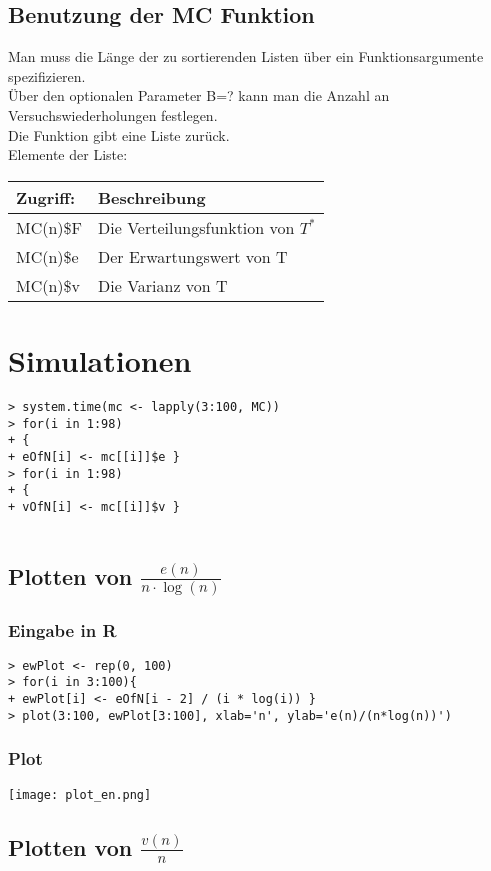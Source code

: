 \documentclass[a4paper, 10pt]{article}
\begin{document}
\subsection{Benutzung der MC Funktion}
Man muss die Länge der zu sortierenden Listen über ein Funktionsargumente spezifizieren.\\
Über den optionalen Parameter B=? kann man die Anzahl an Versuchswiederholungen festlegen.\\
Die Funktion gibt eine Liste zurück.\\
Elemente der Liste:\\
\begin{tabular}{l|l}
Zugriff: & Beschreibung \\ \hline
MC(n)\$F &	Die Verteilungsfunktion von $T^* $ \\
MC(n)\$e & Der Erwartungswert von T \\
MC(n)\$v & Die Varianz von T 

\end{tabular}
\section{Simulationen}
\begin{lstlisting}
> system.time(mc <- lapply(3:100, MC))
> for(i in 1:98)
+ {
+ eOfN[i] <- mc[[i]]$e }
> for(i in 1:98)
+ {
+ vOfN[i] <- mc[[i]]$v }


\end{lstlisting}
\subsection{Plotten von $ \frac{e(n)}{n\cdot \log(n)}$}
\subsubsection{Eingabe in R}
\begin{lstlisting}
> ewPlot <- rep(0, 100)
> for(i in 3:100){
+ ewPlot[i] <- eOfN[i - 2] / (i * log(i)) }
> plot(3:100, ewPlot[3:100], xlab='n', ylab='e(n)/(n*log(n))')
\end{lstlisting}
\subsubsection{Plot}
\texttt{[image: plot\_en.png]} 
\subsection{Plotten von $\frac{v(n)}{n}$}
\end{document}
